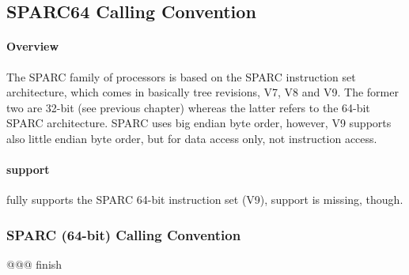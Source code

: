 %
%
%
%

\subsection{SPARC64 Calling Convention}

\paragraph{Overview}

The SPARC family of processors is based on the SPARC instruction set architecture, which comes in basically tree revisions,
V7, V8 and V9.\cite{SPARCRef} The former two are 32-bit (see previous chapter) whereas the latter refers to the 64-bit SPARC architecture.
SPARC uses big endian byte order, however, V9 supports also little endian byte order, but for data access only, not instruction access.\cite{SPARCV9}\\

\paragraph{ support}

 fully supports the SPARC 64-bit instruction set (V9),  support is missing, though.

\subsubsection{SPARC (64-bit) Calling Convention}

@@@ finish
